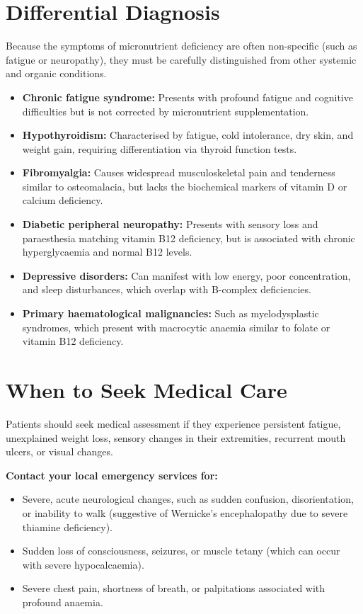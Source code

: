 \section*{Differential Diagnosis}
Because the symptoms of micronutrient deficiency are often non-specific (such as fatigue or neuropathy), they must be carefully distinguished from other systemic and organic conditions.
\begin{itemize}
    \item \textbf{Chronic fatigue syndrome:} Presents with profound fatigue and cognitive difficulties but is not corrected by micronutrient supplementation.
    \item \textbf{Hypothyroidism:} Characterised by fatigue, cold intolerance, dry skin, and weight gain, requiring differentiation via thyroid function tests.
    \item \textbf{Fibromyalgia:} Causes widespread musculoskeletal pain and tenderness similar to osteomalacia, but lacks the biochemical markers of vitamin D or calcium deficiency.
    \item \textbf{Diabetic peripheral neuropathy:} Presents with sensory loss and paraesthesia matching vitamin B12 deficiency, but is associated with chronic hyperglycaemia and normal B12 levels.
    \item \textbf{Depressive disorders:} Can manifest with low energy, poor concentration, and sleep disturbances, which overlap with B-complex deficiencies.
    \item \textbf{Primary haematological malignancies:} Such as myelodysplastic syndromes, which present with macrocytic anaemia similar to folate or vitamin B12 deficiency.
\end{itemize}

\section*{When to Seek Medical Care}
Patients should seek medical assessment if they experience persistent fatigue, unexplained weight loss, sensory changes in their extremities, recurrent mouth ulcers, or visual changes.

\textbf{Contact your local emergency services for:}
\begin{itemize}
    \item Severe, acute neurological changes, such as sudden confusion, disorientation, or inability to walk (suggestive of Wernicke's encephalopathy due to severe thiamine deficiency).
    \item Sudden loss of consciousness, seizures, or muscle tetany (which can occur with severe hypocalcaemia).
    \item Severe chest pain, shortness of breath, or palpitations associated with profound anaemia.
\end{itemize}

